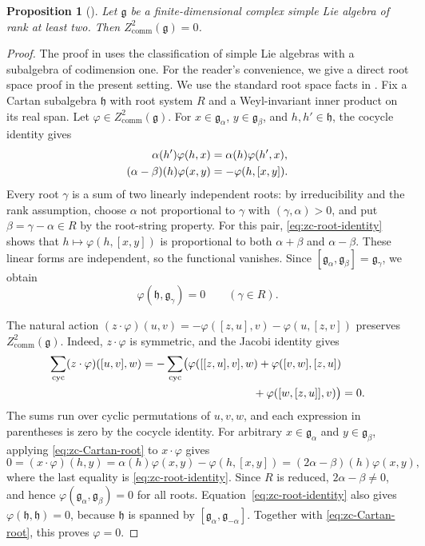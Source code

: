 \documentclass[11pt,reqno]{amsart}
\numberwithin{equation}{section}
\newcommand{\g}{\mathfrak g}
\newtheorem{proposition}[theorem]{Proposition}
\theoremstyle{definition}
\theoremstyle{remark}
\begin{document}
\begin{proposition}[{\cite[Corollary~2.5]{DZ10}}]\label{prop:zcomm}
Let \(\g\) be a finite-dimensional complex simple Lie algebra
of rank at least two. Then \(Z^2_{\mathrm{comm}}(\g)=0\).
\end{proposition}
\begin{proof}
The proof in \cite{DZ10} uses the classification of simple
Lie algebras with a subalgebra of codimension one. For the reader's
convenience, we give a direct root space proof in the present setting.
We use the standard root space facts in \cite{Humphreys72}.
Fix a Cartan subalgebra \(\mathfrak h\) with root system \(R\)
and a Weyl-invariant inner product on its real span.
Let \(\varphi\in Z^2_{\mathrm{comm}}(\g)\).
For \(x\in\g_\alpha\), \(y\in\g_\beta\), and
\(h,h'\in\mathfrak h\), the cocycle identity gives
\begin{align}
\alpha(h')\varphi(h,x)&=\alpha(h)\varphi(h',x),\notag\\
(\alpha-\beta)(h)\varphi(x,y)&=-\varphi(h,[x,y]).
\label{eq:zc-root-identity}
\end{align}
Every root \(\gamma\) is a sum of two linearly independent roots:
by irreducibility and the rank assumption, choose \(\alpha\) not proportional
to \(\gamma\) with \((\gamma,\alpha)>0\), and put
\(\beta=\gamma-\alpha\in R\) by the root-string property.
For this pair, \eqref{eq:zc-root-identity} shows that
\(h\mapsto\varphi(h,[x,y])\) is proportional to both
\(\alpha+\beta\) and \(\alpha-\beta\).
These linear forms are independent, so the functional vanishes.
Since \([\g_\alpha,\g_\beta]=\g_\gamma\), we obtain
\begin{equation}\label{eq:zc-Cartan-root}
\varphi(\mathfrak h,\g_\gamma)=0\qquad(\gamma\in R).
\end{equation}

The natural action
\((z\cdot\varphi)(u,v)=-\varphi([z,u],v)-\varphi(u,[z,v])\)
preserves \(Z^2_{\mathrm{comm}}(\g)\). Indeed,
\(z\cdot\varphi\) is symmetric, and the Jacobi identity gives
\[
\begin{aligned}
\sum_{\mathrm{cyc}}(z\cdot\varphi)([u,v],w)
&=-\sum_{\mathrm{cyc}}\bigl(
\varphi([[z,u],v],w)+\varphi([v,w],[z,u])\\
&\hspace{35mm}+\varphi([w,[z,u]],v)\bigr)=0.
\end{aligned}
\]
The sums run over cyclic permutations of \(u,v,w\),
and each expression in parentheses is zero by the cocycle identity.
For arbitrary \(x\in\g_\alpha\) and \(y\in\g_\beta\),
applying \eqref{eq:zc-Cartan-root} to \(x\cdot\varphi\) gives
\[
0=(x\cdot\varphi)(h,y)
=\alpha(h)\varphi(x,y)-\varphi(h,[x,y])
=(2\alpha-\beta)(h)\varphi(x,y),
\]
where the last equality is \eqref{eq:zc-root-identity}.
Since \(R\) is reduced, \(2\alpha-\beta\ne0\), and hence
\(\varphi(\g_\alpha,\g_\beta)=0\) for all roots.
Equation~\eqref{eq:zc-root-identity} also gives
\(\varphi(\mathfrak h,\mathfrak h)=0\), because
\(\mathfrak h\) is spanned by \([\g_\alpha,\g_{-\alpha}]\).
Together with \eqref{eq:zc-Cartan-root}, this proves \(\varphi=0\).
\end{proof}
\end{document}
